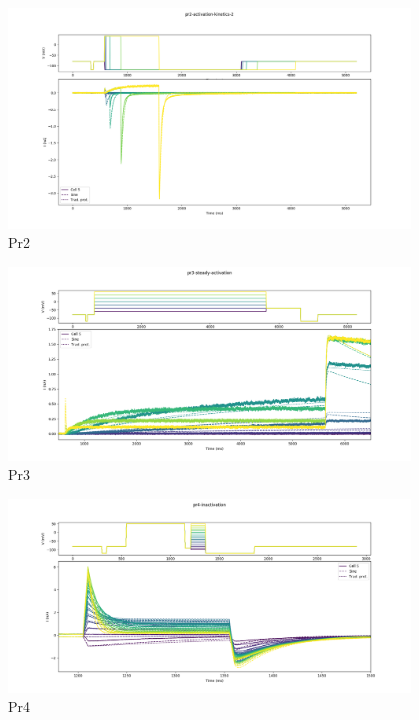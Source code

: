 \documentclass[preprint,authoryear,10pt]{elsarticle}
\begin{document}
\begin{figure}[H]
\centerline{
\includegraphics[width=0.95\textwidth]{fig/validation-pr2}
}
\caption{%
Pr2
}
\label{fig:validation-pr2}
\end{figure}

\begin{figure}[H]
\centerline{
\includegraphics[width=0.95\textwidth]{fig/validation-pr3}
}
\caption{%
Pr3
}
\label{fig:validation-pr3}
\end{figure}

\begin{figure}[H]
\centerline{
\includegraphics[width=0.95\textwidth]{fig/validation-pr4}
}
\caption{%
Pr4
}
\label{fig:validation-pr4}
\end{figure}
\end{document}

